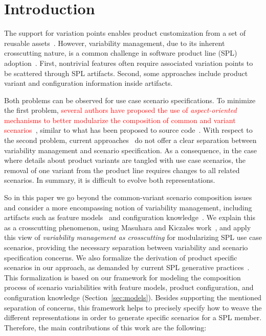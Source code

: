 \documentclass{acm_proc_article-sp}
\begin{document}


\section{Introduction}
The support for variation points enables product customization from a set of
reusable assets~\cite{Pohl:2005aa}. However, variability management, due to its
inherent crosscutting nature, is a common challenge in software product line
(SPL) adoption~\cite{Clements:2001aa,Pohl:2005aa}. First, nontrivial features
often require associated variation points to be scattered through SPL artifacts.
Second, some approaches include product variant and configuration information
inside artifacts.

Both problems can be observed for use case scenario specifications. To minimize
the first problem, \textcolor{red}{several authors have proposed the use of
\emph{aspect-oriented} mechanisms to better modularize the composition of common
and variant scenarios~\cite{moreira-re07,eriksson-splc-2005,pohl-caise-2005}},
similar to what has been proposed to source code~\cite{alves-gpce-06,
apel-icse2006}. With respect to the second problem, current
approaches~\cite{favaro-icsr-98,Bertolino:2003aa,Eriksson:2005aa} do not offer a
clear separation between variability management and scenario specification. As a
consequence, in the case where details about product variants are tangled with
use case scenarios, the removal of one variant from the product line requires
changes to all related scenarios. In summary, it is difficult to evolve both
representations.

So in this paper we go beyond the common-variant scenario composition issues and
consider a more encompassing notion of variability management, including
artifacts such as feature models~\cite{gheyi-alloy-06,Czarnecki:2000aa} and
configuration knowledge~\cite{Czarnecki:2000aa,Pohl:2005aa}. We explain this as a
crosscutting phenomenon, using Masuhara and Kiczales work~\cite{Masuhara:2003aa},
and apply this view of \emph{variability management as crosscutting} for
modularizing SPL use case scenarios, providing the necessary separation between
variability and scenario specification concerns. We also formalize the derivation
of product specific scenarios in our approach, as demanded by current SPL
generative practices~\cite{krueger-cacm-200712}. This formalization is based on
our framework for modeling the composition process of scenario variabilities with
feature models, product configuration, and configuration knowledge
(Section~\ref{sec:models}). Besides supporting the mentioned separation of
concerns, this framework helps to precisely specify how to weave the different
representations in order to generate specific scenarios for a SPL member.
Therefore, the main contributions of this work are the following:
\end{document}

